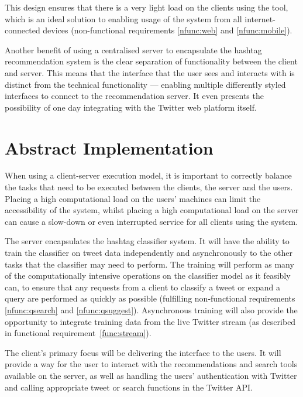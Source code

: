 \documentclass[11pt,a4paper]{report}
\begin{document}
This design ensures that there is a very light load on the clients using the tool, which is an ideal solution to enabling usage of the system from all internet-connected devices (non-functional requirements \ref{nfunc:web} and \ref{nfunc:mobile}).

Another benefit of using a centralised server to encapsulate the hashtag recommendation system is the clear separation of functionality between the client and server. This means that the interface that the user sees and interacts with is distinct from the technical functionality --- enabling multiple differently styled interfaces to connect to the recommendation server. It even presents the possibility of one day integrating with the Twitter web platform itself.

\section{Abstract Implementation}

When using a client-server execution model, it is important to correctly balance the tasks that need to be executed between the clients, the server and the users. Placing a high computational load on the users' machines can limit the accessibility of the system, whilst placing a high computational load on the server can cause a slow-down or even interrupted service for all clients using the system.

The server encapsulates the hashtag classifier system. It will have the ability to train the classifier on tweet data independently and asynchronously to the other tasks that the classifier may need to perform. The training will perform as many of the computationally intensive operations on the classifier model as it feasibly can, to ensure that any requests from a client to classify a tweet or expand a query are performed as quickly as possible (fulfilling non-functional requirements \ref{nfunc:qsearch} and \ref{nfunc:qsuggest}). Asynchronous training will also provide the opportunity to integrate training data from the live Twitter stream (as described in functional requirement~\ref{func:stream}).

The client's primary focus will be delivering the interface to the users. It will provide a way for the user to interact with the recommendations and search tools available on the server, as well as handling the users' authentication with Twitter and calling appropriate tweet or search functions in the Twitter API.
\end{document}
